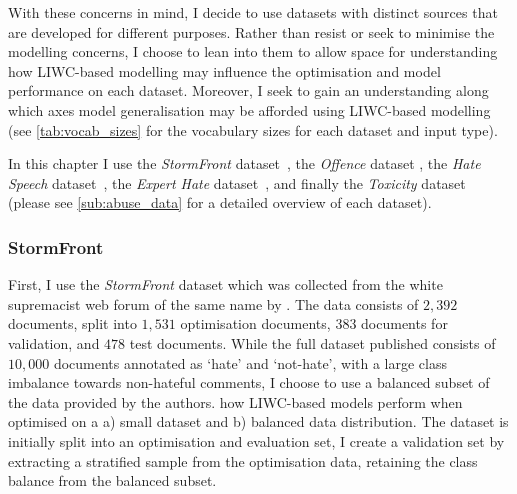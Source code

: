 With these concerns in mind, I decide to use datasets with distinct sources that are developed for different purposes.
Rather than resist or seek to minimise the modelling concerns, I choose to lean into them to allow space for understanding how LIWC-based modelling may influence the optimisation and model performance on each dataset.
Moreover, I seek to gain an understanding along which axes model generalisation may be afforded using LIWC-based modelling (see \cref{tab:vocab_sizes} for the vocabulary sizes for each dataset and input type).

In this chapter I use the \textit{StormFront} dataset~\citep{Garcia:2019}, the \textit{Offence} dataset \citep{Davidson:2017}, the \textit{Hate Speech} dataset~\citep{Waseem-Hovy:2016}, the \textit{Expert Hate} dataset~\citep{Waseem:2016}, and finally the \textit{Toxicity} dataset~\citep{Wulczyn:2017} (please see \cref{sub:abuse_data} for a detailed overview of each dataset).

\subsubsection{StormFront}
First, I use the \textit{StormFront} dataset which was collected from the white supremacist web forum of the same name by \citet{Garcia:2019}.
The data consists of $2,392$ documents, split into $1,531$ optimisation documents, $383$ documents for validation, and $478$ test documents.
While the full dataset published consists of $10,000$ documents annotated as `hate' and `not-hate', with a large class imbalance towards non-hateful comments, I choose to use a balanced subset of the data provided by the authors.
 how LIWC-based models perform when optimised on a a) small dataset and b) balanced data distribution.
The dataset is initially split into an optimisation and evaluation set, I  create a validation set by extracting a stratified sample from the optimisation data, retaining the class balance from the balanced subset.

